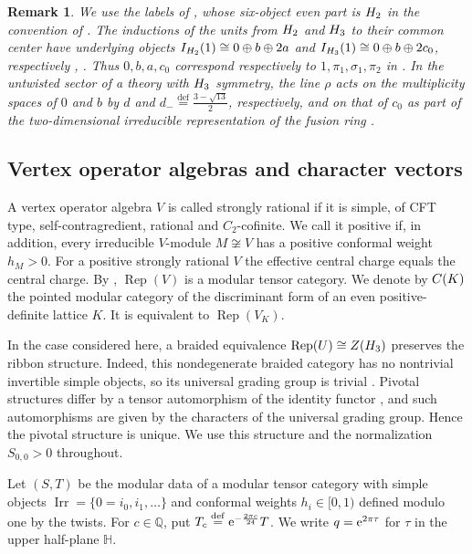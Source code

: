 \documentclass[leqno]{article}
\let\cal\relax
\newcommand{\cal}{\mathcal}
\let\i\relax
\newcommand{\i}{\mathrm{i}}
\newcommand{\ov}{\overset}
\newcommand{\e}{\mathrm{e}}
\DeclareMathOperator{\Irr}{Irr}
\DeclareMathOperator{\Rep}{Rep}
\newtheorem{remark}[thm]{Remark}
\numberwithin{equation}{section}
\begin{document}
\begin{remark}\normalfont
\label{rem:labels}
We use the labels of \cite{EvG11}, whose six-object even part is $\cal H_2$ in the convention of \cite{GrS12}. The inductions of the units from $\cal H_2$ and $\cal H_3$ to their common center have underlying objects $I_{\cal H_2}(1) \cong 0 \oplus b \oplus 2a$ and $I_{\cal H_3}(1) \cong 0 \oplus b \oplus 2c_0$, respectively \cite[Section 2.2]{EvG11}, \cite[Corollary 3.8 and Remark 3.7]{ArhNets}. Thus $0,b,a,c_0$ correspond respectively to $1,\pi_1,\sigma_1,\pi_2$ in \cite{AHKZ26,BoS25}. In the untwisted sector of a theory with $\cal H_3$ symmetry, the line $\rho$ acts on the multiplicity spaces of $0$ and $b$ by $d$ and $d_- \ov{\mathrm{def}}{=} \frac{3-\sqrt{13}}{2}$, respectively, and on that of $c_0$ as part of the two-dimensional irreducible representation of the fusion ring \cite[Appendix A]{AHKZ26}.
\end{remark}

\subsection{Vertex operator algebras and character vectors}

A vertex operator algebra $V$ is called strongly rational if it is simple, of CFT type, self-contragredient, rational and $C_2$-cofinite. We call it positive if, in addition, every irreducible $V$-module $M \not\cong V$ has a positive conformal weight $h_M > 0$. For a positive strongly rational $V$ the effective central charge equals the central charge. By \cite{Hua08}, $\Rep(V)$ is a modular tensor category. We denote by $\cal C(K)$ the pointed modular category of the discriminant form of an even positive-definite lattice $K$. It is equivalent to $\Rep(V_K)$.

In the case considered here, a braided equivalence $\Rep(U) \cong Z(\cal H_3)$ preserves the ribbon structure. Indeed, this nondegenerate braided category has no nontrivial invertible simple objects, so its universal grading group is trivial \cite[Theorem 6.3]{GeN08}. Pivotal structures differ by a tensor automorphism of the identity functor \cite{ENO05}, and such automorphisms are given by the characters of the universal grading group. Hence the pivotal structure is unique. We use this structure and the normalization $S_{0,0} > 0$ throughout.

Let $(S,T)$ be the modular data of a modular tensor category with simple objects $\Irr = \{0 = i_0,i_1,\ldots\}$ and conformal weights $h_i \in [0,1)$ defined modulo one by the twists. For $c \in \mathbb{Q}$, put $T_c \ov{\mathrm{def}}{=} \e^{-\frac{2\pi\i c}{24}}T$. We write $q = \e^{2\pi\i\tau}$ for $\tau$ in the upper half-plane $\mathbb H$.
\end{document}
